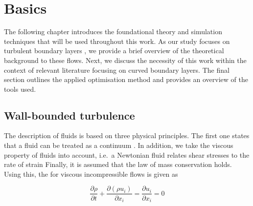 
\chapter{Basics}
\label{chap:basics}
The following chapter introduces the foundational theory and simulation techniques that will be used throughout this work. As our study focuses on turbulent boundary layers , we provide a brief overview of the theoretical background to these flows. Next, we discuss the necessity of this work within the context of relevant literature focusing on curved boundary layers. The final section outlines the applied optimisation method and provides an overview of the tools used. 





\section{Wall-bounded turbulence}\label{sec:turbulenceTheory}


The description of fluids is based on three physical principles. 
The first one  states that a fluid can be treated as a continuum \citep{schlichting_boundary-layer_2017} .
In addition, we take the viscous property of fluids into account, i.e.~a Newtonian fluid relates shear stresses to the rate of strain \citep{tennekes_first_1972}
Finally, it is assumed that the law of mass conservation  holds.
Using this, the  for viscous incompressible flows is given 
as

\begin{equation}
    \frac{\partial \rho}{\partial t} + \frac{\partial (\rho u_i)}{\partial x_i} = \frac{\partial u_i}{\partial x_i} = 0
\end{equation}

